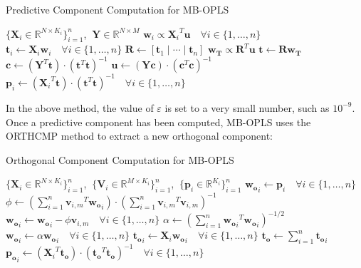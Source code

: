 \begin{algorithm}[H]
\caption{Predictive Component Computation for MB-OPLS}
\label{algorithm.9.3}
\begin{algorithmic}[1]
\REQUIRE $\{\mathbf{X}_i \in \mathbb{R}^{N \times K_i}\}_{i=1}^n$,%
         $\:\mathbf{Y} \in \mathbb{R}^{N \times M}$
\REPEAT
  \STATE $\mathbf{w}_i \propto {\mathbf{X}_i}^T \mathbf{u}
          \quad \forall i \in \{1, \dots, n\}$
  \STATE $\mathbf{t}_i \gets \mathbf{X}_i \mathbf{w}_i
          \quad \forall i \in \{1, \dots, n\}$
  \STATE $\mathbf{R} \gets [\mathbf{t}_1 \mid\cdots\mid \mathbf{t}_n]$
  \STATE $\mathbf{w_T} \propto \mathbf{R}^T \mathbf{u}$
  \STATE $\mathbf{t} \gets \mathbf{R} \mathbf{w_T}$
  \STATE $\mathbf{c} \gets
          \left( \mathbf{Y}^T \mathbf{t} \right) \cdot
          \left( \mathbf{t}^T \mathbf{t} \right)^{-1}$
  \STATE $\mathbf{u} \gets
          \left( \mathbf{Y} \mathbf{c} \right) \cdot
          \left( \mathbf{c}^T \mathbf{c} \right)^{-1}$
\STATE $\mathbf{p}_i \gets
        \left( {\mathbf{X}_i}^T \mathbf{t} \right) \cdot
        \left( \mathbf{t}^T \mathbf{t} \right)^{-1}
        \quad \forall i \in \{1, \dots, n\}$
\end{algorithmic}
\end{algorithm}

\begin{doublespace}
In the above method, the value of $\varepsilon$ is set to a very small
number, such as $10^{-9}$. Once a predictive component has been computed,
MB-OPLS uses the ORTHCMP method to extract a new orthogonal component:
\end{doublespace}

\begin{algorithm}[H]
\caption{Orthogonal Component Computation for MB-OPLS}
\label{algorithm.9.4}
\begin{algorithmic}[1]
\REQUIRE $\{\mathbf{X}_i \in \mathbb{R}^{N \times K_i}\}_{i=1}^n$,%
       $\:\{\mathbf{V}_i \in \mathbb{R}^{M \times K_i}\}_{i=1}^n$,%
       $\:\{\mathbf{p}_i \in \mathbb{R}^{K_i}\}_{i=1}^n$
\STATE $\mathbf{w_o}_i \gets \mathbf{p}_i
        \quad \forall i \in \{1, \dots, n\}$
  \STATE $\phi \gets
      \left( \sum_{i=1}^n {\mathbf{v}_{i,m}}^T \mathbf{w_o}_i \right) \cdot
      \left( \sum_{i=1}^n {\mathbf{v}_{i,m}}^T \mathbf{v}_{i,m} \right)^{-1}$
  \STATE $\mathbf{w_o}_i \gets \mathbf{w_o}_i - \phi \mathbf{v}_{i,m}
          \quad \forall i \in \{1, \dots, n\}$
\ENDFOR
\STATE $\alpha \gets \left(
         \sum_{i=1}^n {\mathbf{w_o}_i}^T \mathbf{w_o}_i
        \right)^{-1/2}$
\STATE $\mathbf{w_o}_i \gets \alpha \mathbf{w_o}_i
        \quad \forall i \in \{1, \dots, n\}$
\STATE $\mathbf{t_o}_i \gets \mathbf{X}_i \mathbf{w_o}_i
        \quad \forall i \in \{1, \dots, n\}$
\STATE $\mathbf{t_o} \gets \sum_{i=1}^n \mathbf{t_o}_i$
\STATE $\mathbf{p_o}_i \gets
        \left( {\mathbf{X}_i}^T \mathbf{t_o} \right) \cdot
        \left( \mathbf{t_o}^T \mathbf{t_o} \right)^{-1}
        \quad \forall i \in \{1, \dots, n\}$
\end{algorithmic}
\end{algorithm}

